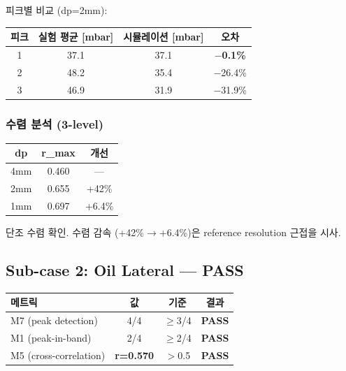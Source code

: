 \documentclass[10pt,a4paper]{article}
\begin{document}
피크별 비교 (dp=2mm):

\begin{center}
\renewcommand{\arraystretch}{1.1}
\begin{tabular}{cccc}
\toprule
피크 & 실험 평균 [mbar] & 시뮬레이션 [mbar] & 오차 \\
\midrule
1 & 37.1 & 37.1 & \textbf{$-$0.1\%} \\
2 & 48.2 & 35.4 & $-$26.4\% \\
3 & 46.9 & 31.9 & $-$31.9\% \\
\bottomrule
\end{tabular}
\end{center}

\subsubsection{수렴 분석 (3-level)}

\begin{center}
\begin{tabular}{ccc}
\toprule
dp & r\_max & 개선 \\
\midrule
4mm & 0.460 & — \\
2mm & 0.655 & +42\% \\
1mm & 0.697 & +6.4\% \\
\bottomrule
\end{tabular}
\end{center}

단조 수렴 확인. 수렴 감속 (+42\%$\rightarrow$+6.4\%)은 reference resolution 근접을 시사.

\subsection{Sub-case 2: Oil Lateral — \textcolor{pass}{PASS}}

\begin{center}
\renewcommand{\arraystretch}{1.2}
\begin{tabular}{lccc}
\toprule
메트릭 & 값 & 기준 & 결과 \\
\midrule
M7 (peak detection) & 4/4 & $\geq$3/4 & \textcolor{pass}{\textbf{PASS}} \\
M1 (peak-in-band) & 2/4 & $\geq$2/4 & \textcolor{pass}{\textbf{PASS}} \\
M5 (cross-correlation) & \textbf{r=0.570} & $>$0.5 & \textcolor{pass}{\textbf{PASS}} \\
\bottomrule
\end{tabular}
\end{center}
\end{document}
